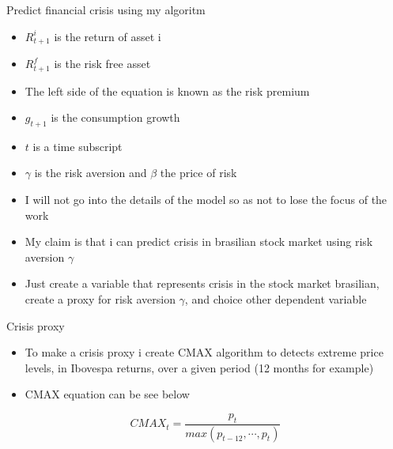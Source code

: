 \documentclass[
  10pt,
  ignorenonframetext,
]{beamer}
\providecommand{\tightlist}{%
  \setlength{\itemsep}{0pt}\setlength{\parskip}{0pt}}
\begin{document}
\begin{frame}{Predict financial crisis using my algoritm}
\protect\hypertarget{predict-financial-crisis-using-my-algoritm-1}{}

\begin{itemize}
\tightlist
\item
  \(R^i_{t+1}\) is the return of asset i
\item
  \(R^f_{t+1}\) is the risk free asset
\item
  The left side of the equation is known as the risk premium
\item
  \(g_{t+1}\) is the consumption growth
\item
  \(t\) is a time subscript
\item
  \(\gamma\) is the risk aversion and \(\beta\) the price of risk
\item
  I will not go into the details of the model so as not to lose the
  focus of the work
\item
  My claim is that i can predict crisis in brasilian stock market using
  risk aversion \(\gamma\)
\item
  Just create a variable that represents crisis in the stock market
  brasilian, create a proxy for risk aversion \(\gamma\), and choice
  other dependent variable
\end{itemize}

\end{frame}

\begin{frame}{Crisis proxy}
\protect\hypertarget{crisis-proxy}{}

\begin{itemize}
\tightlist
\item
  To make a crisis proxy i create CMAX algorithm to detects extreme
  price levels, in Ibovespa returns, over a given period (12 months for
  example)
\item
  CMAX equation can be see below
\end{itemize}

\begin{equation}\label{eq15}
  CMAX_t = \frac{p_t}{max(p_{t-12},\dotsb,p_t)}
\end{equation}

\end{frame}
\end{document}
